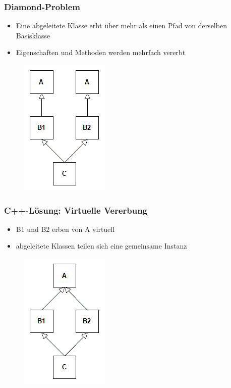 \begin{frame}
	\frametitle{Diamond-Problem}
	\begin{itemize}
		\item Eine abgeleitete Klasse erbt über mehr als einen Pfad von derselben Basisklasse
		\item Eigenschaften und Methoden werden mehrfach vererbt
	\end{itemize}
	\begin{figure}[H]
		\includegraphics[scale=0.75]{vererbung/mehrfach/diamond/nicht_virtuell.png}
	\end{figure}
	
\end{frame}


\begin{frame}
	\frametitle{C++-Lösung: Virtuelle Vererbung}
	\begin{itemize}
		\item B1 und B2 erben von A virtuell
		\item abgeleitete Klassen teilen sich eine gemeinsame Instanz
	\end{itemize}
	\begin{figure}[H]
		\includegraphics[scale=0.75]{vererbung/mehrfach/diamond/virtuell.png}
	\end{figure}
\end{frame}


